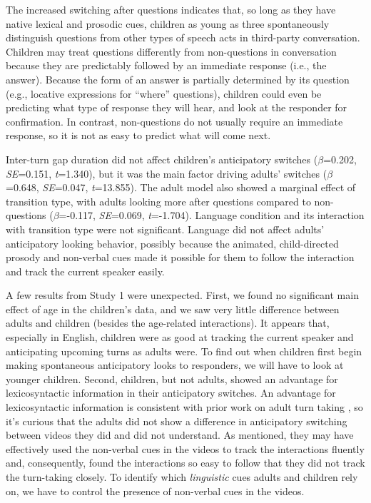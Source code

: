 \documentclass[authoryear, 12pt]{elsarticle}
\begin{document}
The increased switching after questions indicates that, so long as they have native lexical and prosodic cues, children as young as three spontaneously distinguish questions from other types of speech acts in third-party conversation. Children may treat questions differently from non-questions in conversation because they are predictably followed by an immediate response (i.e., the answer). Because the form of an answer is partially determined by its question (e.g., locative expressions for ``where'' questions), children could even be predicting what type of response they will hear, and look at the responder for confirmation. In contrast, non-questions do not usually require an immediate response, so it is not as easy to predict what will come next.

Inter-turn gap duration did not affect children's anticipatory switches (\textit{$\beta$}=0.202, \textit{SE}=0.151, \textit{t}=1.340), but it was the main factor driving adults' switches (\textit{$\beta$}=0.648, \textit{SE}=0.047, \textit{t}=13.855). The adult model also showed a marginal effect of transition type, with adults looking more after questions compared to non-questions (\textit{$\beta$}=-0.117, \textit{SE}=0.069, \textit{t}=-1.704). Language condition and its interaction with transition type were not significant. Language did not affect adults' anticipatory looking behavior, possibly because the animated, child-directed prosody and non-verbal cues made it possible for them to follow the interaction and track the current speaker easily.

A few results from Study 1 were unexpected. First, we found no significant main effect of age in the children's data, and we saw very little difference between adults and children (besides the age-related interactions). It appears that, especially in English, children were as good at tracking the current speaker and anticipating upcoming turns as adults were. To find out when children first begin making spontaneous anticipatory looks to responders, we will have to look at younger children. Second, children, but not adults, showed an advantage for lexicosyntactic information in their anticipatory switches. An advantage for lexicosyntactic information is consistent with prior work on adult turn taking \citep{de-ruiter2006}, so it's curious that the adults did not show a difference in anticipatory switching between videos they did and did not understand. As mentioned, they may have effectively used the non-verbal cues in the videos to track the interactions fluently and, consequently, found the interactions so easy to follow that they did not track the turn-taking closely. To identify which \textit{linguistic} cues adults and children rely on, we have to control the presence of non-verbal cues in the videos.
\end{document}
